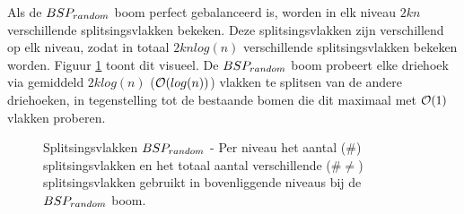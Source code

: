 Als de $\symBSPrandom$ boom perfect gebalanceerd is, worden in elk niveau $2kn$ verschillende splitsingsvlakken bekeken.
Deze splitsingsvlakken zijn verschillend op elk niveau, zodat in totaal $2knlog(n)$ verschillende splitsingsvlakken bekeken worden.
Figuur \ref{fig:splitsingsvlakken-bsprandom} toont dit visueel.
De $\symBSPrandom$ boom probeert elke driehoek via gemiddeld $2klog(n)$ ($\mathcal{O}(log(n))$) vlakken te splitsen van de andere driehoeken, in tegenstelling tot de bestaande bomen die dit maximaal met $\mathcal{O}(1)$ vlakken proberen.\\

\begin{figure}
    \centering

   \label{fig:splitsingsvlakken-bsprandom}
   \caption[Splitsingsvlakken $\symBSPrandom$]%
    {Splitsingsvlakken $\symBSPrandom$ - \small Per niveau het aantal ($\#$) splitsingsvlakken en het totaal aantal verschillende ($\# \neq$) splitsingsvlakken gebruikt in bovenliggende niveaus bij de $\symBSPrandom$ boom.} %
   
\end{figure}

